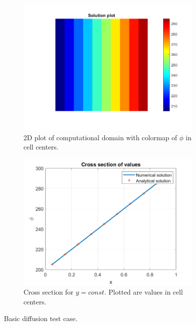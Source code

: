 \documentclass[]{article}
\begin{document}
\begin{figure}
	\centering
	\begin{subfigure}{.49\textwidth}
		\centering
		\includegraphics[width=1\linewidth]{figs/diffusion_default_simulation}
		\caption{2D plot of computational domain with colormap of $ \phi $ in cell centers.}
		\label{fig:diffusiondefaultsimulation}
	\end{subfigure}
	\begin{subfigure}{.49\textwidth}
		\centering
		\includegraphics[width=1\linewidth]{figs/diffusion_default_cross}
		\caption{Cross section for $ y = const.$ Plotted are values in cell centers.}
		\label{fig:diffusiondefaultcross}
	\end{subfigure}
	\caption{Basic diffusion test case.}
	\label{fig:diffusion_default}
\end{figure}
\end{document}
